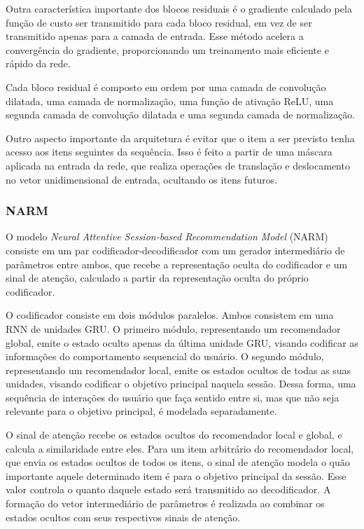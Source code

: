 Outra característica importante dos blocos residuais é o gradiente
calculado pela função de custo ser transmitido para cada bloco residual, em vez
de ser transmitido apenas para a camada de entrada. Esse método acelera a
convergência do gradiente, proporcionando um treinamento mais eficiente e rápido
da rede.

Cada bloco residual é composto em ordem por uma camada de convolução dilatada,
uma camada de normalização, uma função de ativação ReLU, uma segunda camada de
convolução dilatada e uma segunda camada de normalização.

Outro aspecto importante da arquitetura é evitar que o item a ser previsto tenha
acesso aos itens seguintes da sequência. Isso é feito a partir de uma máscara
aplicada na entrada da rede, que realiza operações de translação e deslocamento
no vetor unidimensional de entrada, ocultando os itens futuros.

\subsubsection{NARM}
O modelo \textit{Neural Attentive Session-based Recommendation Model} (NARM)
\cite{narm} consiste em um par codificador-decodificador com um gerador
intermediário de parâmetros entre ambos, que recebe a representação oculta do
codificador e um sinal de atenção, calculado a partir da representação oculta do
próprio codificador.

O codificador consiste em dois módulos paralelos. Ambos consistem em uma RNN de
unidades GRU. O primeiro módulo, representando um recomendador global, emite o
estado oculto apenas da última unidade GRU, visando codificar as informações do
comportamento sequencial do usuário. O segundo módulo, representando um
recomendador local, emite os estados ocultos de todas as suas unidades, visando
codificar o objetivo principal naquela sessão. Dessa forma, uma sequência de
interações do usuário que faça sentido entre si, mas que não seja relevante para
o objetivo principal, é modelada separadamente.

O sinal de atenção recebe os estados ocultos do recomendador local e global, e
calcula a similaridade entre eles. Para um item arbitrário do recomendador local, que envia os estados ocultos de
todos os itens, o sinal de atenção modela o quão importante aquele determinado
item é para o objetivo principal da sessão. Esse valor controla o quanto daquele
estado será transmitido ao decodificador. A formação do vetor intermediário de
parâmetros é realizada ao combinar os estados ocultos com seus respectivos
sinais de atenção.

